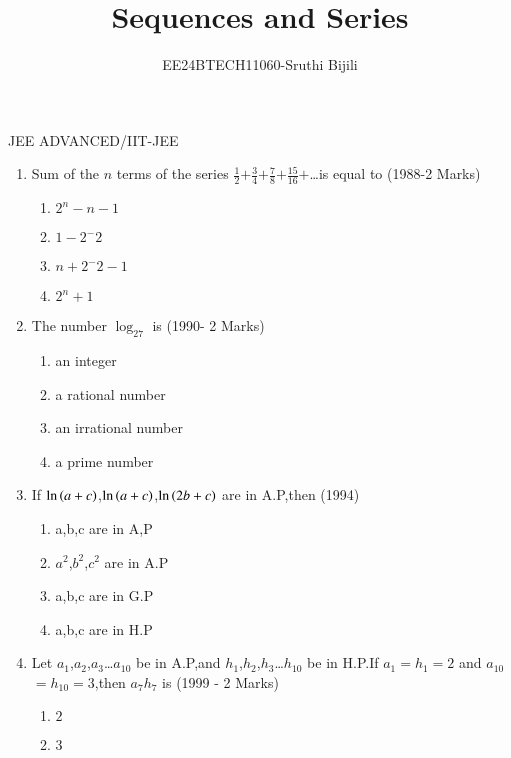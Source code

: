 \documentclass[journal,12pt,twocolumn]{IEEEtran}
\theoremstyle{remark}
\begin{document}

\vspace{3cm}
\title{Sequences and Series}
\author{EE24BTECH11060-Sruthi Bijili}
\maketitle
\newpage
\bigskip
\renewcommand{\thefigure}{\theenumi}
\renewcommand{\thetable}{\theenumi}
JEE ADVANCED/IIT-JEE\\

\begin{enumerate} [start=5]
    \item Sum of the $n$ terms of the series $\frac{1}{2}$$+$$\frac{3}{4}$$+$$\frac{7}{8}$$+$$\frac{15}{16}$$+$\dots is equal to
    \hfill(1988-2 Marks)
    \begin{enumerate}
        \item $2^n-n-1$
        \item $1-2^-2$
        \item $n+2^-2-1$
        \item $2^n+1$
         \end{enumerate}
    \item  The number $ \log_27$ is
    \hfill(1990- 2 Marks)
    \begin{enumerate}
        \item an integer
        \item a rational number
        \item an irrational number
        \item a prime number
    \end{enumerate}
    \item  If $\ln\left(a+c\right)$,$\ln\left(a+c\right)$,$\ln\left(2b+c\right)$ are in A.P,then
    \hfill(1994)
    \begin{enumerate}
        \item a,b,c are in A,P
        \item $a^2$,$b^2$,$c^2$ are in A.P
        \item a,b,c are in G.P
        \item a,b,c are in H.P
    \end{enumerate}
    \item Let $a_{1}$,$a_{2}$,$a_{3}$\dots$a_{10}$ be in A.P,and $h_{1}$,$h_{2}$,$h_{3}$\dots$h_{10}$ be in H.P.If $a_{1}$$=$$h_{1}$$=$$2$ and $a_{10}$$=$$h_{10}$$=$$3$,then $a_{7}$$h_{7}$ is
    \hfill(1999 - 2 Marks)
    \begin{enumerate}
        \item $2$
        \item $3$

\end{enumerate}
\end{enumerate}
\end{document}
